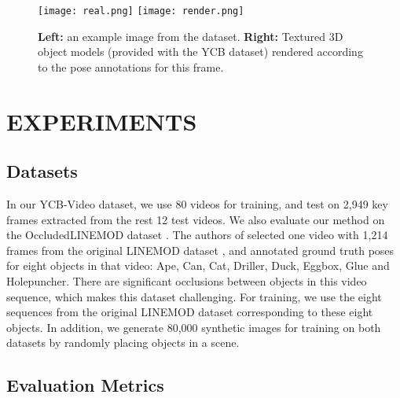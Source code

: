 \documentclass[conference]{IEEEtran}
\begin{document}
\begin{figure}
	\centering
	\texttt{[image: real.png]}
	\texttt{[image: render.png]}
	\caption{\small \textbf{Left:} an example image from the dataset. \textbf{Right:} Textured 3D object models (provided with the YCB dataset) rendered according to the pose annotations for this frame. }
	\label{fig:DatasetExample}
	\vspace{-4mm}
\end{figure}



\section{EXPERIMENTS}



\subsection{Datasets}

In our YCB-Video dataset, we use 80 videos for training, and test on 2,949 key frames extracted from the rest 12 test videos. We also evaluate our method on the OccludedLINEMOD dataset \cite{krull2015learning}. The authors of \cite{krull2015learning} selected one video with 1,214 frames from the original LINEMOD dataset \cite{hinterstoisser2012model}, and annotated ground truth poses for eight objects in that video: Ape, Can, Cat, Driller, Duck, Eggbox, Glue and Holepuncher. There are significant occlusions between objects in this video sequence, which makes this dataset challenging. For training, we use the eight sequences from the original LINEMOD dataset corresponding to these eight objects. In addition, we generate 80,000 synthetic images for training on both datasets by randomly placing objects in a scene.

\subsection{Evaluation Metrics}
\end{document}
